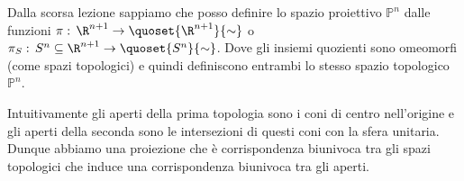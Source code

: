 

\begin{defn}
Dalla scorsa lezione sappiamo che posso definire lo spazio proiettivo 
$\mathbb{P}^n$ dalle funzioni $\pi: \, \R^{n+1} \rightarrow \quoset {\R^{n+1}}{\sim}$ o $\pi_S: \, S^n \subseteq \R^{n+1} \rightarrow \quoset {S^{n}}{\sim}$. Dove gli insiemi quozienti sono omeomorfi (come spazi topologici) e quindi definiscono entrambi lo stesso spazio topologico $\mathbb{P}^{n}$.
\end{defn}
\begin{oss}
Intuitivamente gli aperti della prima topologia sono i coni di centro nell'origine e gli aperti della seconda sono le intersezioni di questi coni con la sfera unitaria. Dunque abbiamo una proiezione che è corrispondenza biunivoca tra gli spazi topologici che induce una corrispondenza biunivoca tra gli aperti.
\end{oss}

